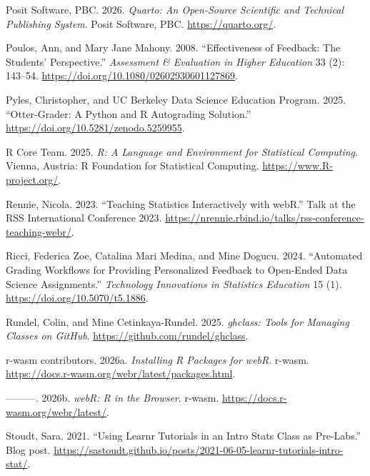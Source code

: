 \documentclass[
  letterpaper,
  DIV=11,
  numbers=noendperiod]{scrartcl}
\newlength{\cslhangindent}
\newenvironment{CSLReferences}[2] %
 {\begin{list}{}{%
  \setlength{\itemindent}{0pt}
  \setlength{\leftmargin}{0pt}
  \setlength{\parsep}{0pt}
  \ifodd #1
   \setlength{\leftmargin}{\cslhangindent}
   \setlength{\itemindent}{-1\cslhangindent}
  \fi
  \setlength{\itemsep}{#2\baselineskip}}}
 {\end{list}}
\begin{document}
\begin{CSLReferences}{1}{0}
Posit Software, PBC. 2026. \emph{{Quarto}: An Open-Source Scientific and
Technical Publishing System}. Posit Software, PBC.
\url{https://quarto.org/}.

Poulos, Ann, and Mary Jane Mahony. 2008. {``Effectiveness of Feedback:
The Students' Perspective.''} \emph{Assessment \& Evaluation in Higher
Education} 33 (2): 143--54.
\url{https://doi.org/10.1080/02602930601127869}.

Pyles, Christopher, and UC Berkeley Data Science Education Program.
2025. {``{Otter-Grader}: A {P}ython and {R} Autograding Solution.''}
\url{https://doi.org/10.5281/zenodo.5259955}.

R Core Team. 2025. \emph{R: A Language and Environment for Statistical
Computing}. Vienna, Austria: R Foundation for Statistical Computing.
\url{https://www.R-project.org/}.

Rennie, Nicola. 2023. {``Teaching Statistics Interactively with webR.''}
Talk at the RSS International Conference 2023.
\url{https://nrennie.rbind.io/talks/rss-conference-teaching-webr/}.

Ricci, Federica Zoe, Catalina Mari Medina, and Mine Dogucu. 2024.
{``Automated Grading Workflows for Providing Personalized Feedback to
Open-Ended Data Science Assignments.''} \emph{Technology Innovations in
Statistics Education} 15 (1). \url{https://doi.org/10.5070/t5.1886}.

Rundel, Colin, and Mine Cetinkaya-Rundel. 2025. \emph{{ghclass}: Tools
for Managing Classes on {G}itHub}.
\url{https://github.com/rundel/ghclass}.

r-wasm contributors. 2026a. \emph{Installing {R} Packages for {webR}}.
{r-wasm}. \url{https://docs.r-wasm.org/webr/latest/packages.html}.

---------. 2026b. \emph{{webR}: {R} in the Browser}. {r-wasm}.
\url{https://docs.r-wasm.org/webr/latest/}.

Stoudt, Sara. 2021. {``Using Learnr Tutorials in an Intro Stats Class as
Pre-Labs.''} Blog post.
\url{https://sastoudt.github.io/posts/2021-06-05-learnr-tutorials-intro-stat/}.


\end{CSLReferences}
\end{document}
